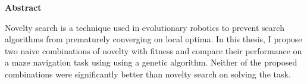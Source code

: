
\vspace*{3cm}

\begin{center}
	\textbf{Abstract}
\end{center}

{
	Novelty search is a technique used in evolutionary robotics to prevent search
	algorithms from prematurely converging on local optima.
	In this thesis, I propose two naive combinations of novelty with fitness and
	compare their performance on a maze navigation task using using a genetic algorithm.
	Neither of the proposed combinations were significantly better than novelty search on
	solving the task.
}

\thispagestyle{empty}
\newpage